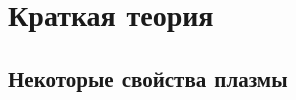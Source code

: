 \documentclass[10pt,pdf,hyperref={unicode}, dvipsnames]{beamer}
\begin{document}
\section{Краткая теория}
\subsection{Некоторые свойства плазмы}

\end{document}
